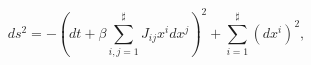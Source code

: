 \begin{equation}
\label{metn5}
ds^2 = - \left( dt + \beta \sum_{i,j=1}^{\sharp} J_{ij} x^i dx^j \right)^2
+ \sum_{i=1}^\sharp (dx^i)^2, 
\end{equation}


